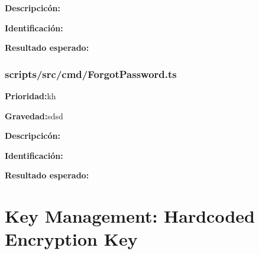 \documentclass{article}
\begin{document}
        \endgroup
            
        \begingroup
        \noindent
        \leftskip 35pt 
        \rightskip 0pt 
        \vspace{10pt}
        \textbf{Descripcicón:}
    
        \endgroup

        \begingroup
        \noindent
        \leftskip 35pt 
        \rightskip 0pt 
        \vspace{10pt}
        \textbf{Identificación:}
        
        \endgroup

        \begingroup
        \noindent
        \leftskip 35pt 
        \rightskip 0pt 
        \vspace{10pt}
        \textbf{Resultado esperado:}
    
        \endgroup
        \subsubsection{scripts/src/cmd/ForgotPassword.ts}
        \begingroup
        \noindent
        \leftskip 35pt 
        \rightskip 0pt 
        \vspace{10pt}
        \textbf{Prioridad:}kh

        \endgroup

        \begingroup
        \noindent
        \leftskip 35pt 
        \rightskip 0pt 
        \vspace{10pt}
        \textbf{Gravedad:}sdsd

        \endgroup
            
        \begingroup
        \noindent
        \leftskip 35pt 
        \rightskip 0pt 
        \vspace{10pt}
        \textbf{Descripcicón:}
    
        \endgroup

        \begingroup
        \noindent
        \leftskip 35pt 
        \rightskip 0pt 
        \vspace{10pt}
        \textbf{Identificación:}
        
        \endgroup

        \begingroup
        \noindent
        \leftskip 35pt 
        \rightskip 0pt 
        \vspace{10pt}
        \textbf{Resultado esperado:}
    
        \endgroup


\section{Key Management: Hardcoded Encryption Key}
\end{document}

